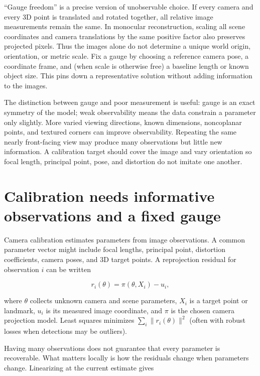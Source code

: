 ``Gauge freedom'' is a precise version of unobservable choice. If every camera and every 3D point is translated and rotated together, all relative image measurements remain the same. In monocular reconstruction, scaling all scene coordinates and camera translations by the same positive factor also preserves projected pixels. Thus the images alone do not determine a unique world origin, orientation, or metric scale. Fix a gauge by choosing a reference camera pose, a coordinate frame, and (when scale is otherwise free) a baseline length or known object size. This pins down a representative solution without adding information to the images.

The distinction between gauge and poor measurement is useful: gauge is an exact symmetry of the model; weak observability means the data constrain a parameter only slightly. More varied viewing directions, known dimensions, noncoplanar points, and textured corners can improve observability. Repeating the same nearly front-facing view may produce many observations but little new information. A calibration target should cover the image and vary orientation so focal length, principal point, pose, and distortion do not imitate one another.

\section{Calibration needs informative observations and a fixed gauge}\label{02-foundations-ii-ch036-calibration-needs-informative-observations-and-a-fixed-gauge}

\hypertarget{02-foundations-ii-ch036-calibration-needs-informative-observations-and-a-fixed-gauge}{}

Camera calibration estimates parameters from image observations. A common parameter vector might include focal lengths, principal point, distortion coefficients, camera poses, and 3D target points. A reprojection residual for observation \(i\) can be written

\[
r_i(\theta)=\pi(\theta, X_i)-u_i,
\]

where \(\theta\) collects unknown camera and scene parameters, \(X_i\) is a target point or landmark, \(u_i\) is its measured image coordinate, and \(\pi\) is the chosen camera projection model. Least squares minimizes \(\sum_i \|r_i(\theta)\|^2\) (often with robust losses when detections may be outliers).

Having many observations does not guarantee that every parameter is recoverable. What matters locally is how the residuals change when parameters change. Linearizing at the current estimate gives

